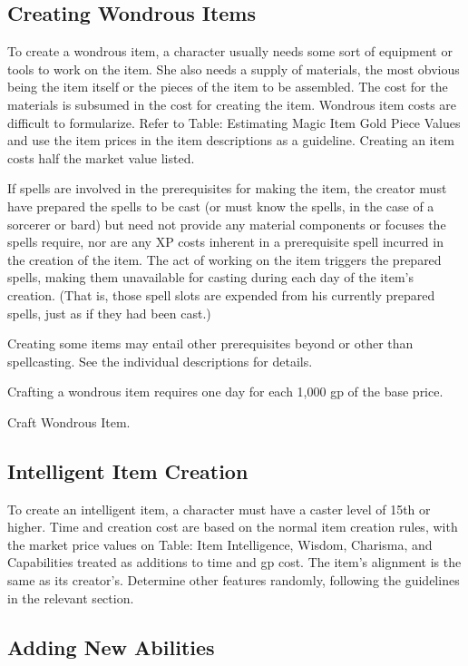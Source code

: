 \subsection{Creating Wondrous Items}

To create a wondrous item, a character usually needs some sort of equipment or tools to work on the item. She also needs a supply of materials, the most obvious being the item itself or the pieces of the item to be assembled. The cost for the materials is subsumed in the cost for creating the item. Wondrous item costs are difficult to formularize. Refer to Table: Estimating Magic Item Gold Piece Values and use the item prices in the item descriptions as a guideline. Creating an item costs half the market value listed.

If spells are involved in the prerequisites for making the item, the creator must have prepared the spells to be cast (or must know the spells, in the case of a sorcerer or bard) but need not provide any material components or focuses the spells require, nor are any XP costs inherent in a prerequisite spell incurred in the creation of the item. The act of working on the item triggers the prepared spells, making them unavailable for casting during each day of the item's creation. (That is, those spell slots are expended from his currently prepared spells, just as if they had been cast.)

Creating some items may entail other prerequisites beyond or other than spellcasting. See the individual descriptions for details.

Crafting a wondrous item requires one day for each 1,000 gp of the base price.

 Craft Wondrous Item.

\subsection{Intelligent Item Creation}

To create an intelligent item, a character must have a caster level of 15th or higher. Time and creation cost are based on the normal item creation rules, with the market price values on Table: Item Intelligence, Wisdom, Charisma, and Capabilities treated as additions to time and gp cost. The item's alignment is the same as its creator's. Determine other features randomly, following the guidelines in the relevant section.

\subsection{Adding New Abilities}

